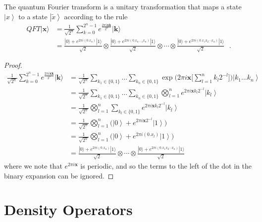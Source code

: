 \documentclass{article}
\newcommand{\ket}[1]{\ensuremath{\left|#1\right\rangle}}
\begin{document}
    \begin{theorem}
      The quantum Fourier transform is a unitary transformation that maps a state $\ket{x}$ to a state $\ket{\tilde{x}}$ according to the rule 
      \begin{align}
      QFT|\mathbf{x}\rangle &= 
      \frac{1}{\sqrt{2^n}} \sum_{k = 0}^{2^n-1} e^{\frac{2 \pi i \mathbf{x} \mathbf{k} }{2^n}} |\mathbf{k}\rangle \\ & = \frac{|0 \rangle + e^{2\pi i (0.x_n)}|1\rangle}{\sqrt{2}} \otimes \frac{|0\rangle + e^{2 \pi i (0.x_{n-1}x_n)}|1\rangle}{\sqrt{2}} \otimes \cdots \otimes \frac{|0\rangle + e^{2 \pi i (0.x_1 x_2\cdots x_n)}|1\rangle}{\sqrt{2}} \ \ \ .
      \end{align}
    \end{theorem}
    \begin{proof} 
      \begin{align} 
        \frac{1}{\sqrt{2^n}} \sum_{k = 0}^{2^n-1} e^{\frac{2 \pi i \mathbf{x} \mathbf{k} }{2^n}} |\mathbf{k}\rangle 
        & = \frac{1}{\sqrt{2^n}} \sum_{k_1 \in \{0, 1\}} \ldots \sum_{k_n \in \{0, 1\}} \exp \bigg( 2 \pi i \mathbf{x} \Big[ \sum_{l=1}^n k_l 2^{-l} \Big]\bigg) \ket{k_1 \ldots k_n} \\
        & = \frac{1}{\sqrt{2^n}} \sum_{k_1 \in \{0, 1\}} \ldots \sum_{k_n \in \{0, 1\}} \bigotimes_{l=1}^n e^{2 \pi i \mathbf{x} k_l 2^{-l}} \ket{k_l} \\
        & = \frac{1}{\sqrt{2^n}} \bigotimes_{l=1}^n \sum_{k_l \in \{0, 1\}} e^{2 \pi i \mathbf{x} k_l 2^{-l}} \ket{k_l} \\
        & = \frac{1}{\sqrt{2^n}} \bigotimes_{l=1}^n \bigg( \ket{0} + e^{2 \pi i \mathbf{x} 2^{-l}} \ket{1} \bigg) \\ 
        & = \frac{1}{\sqrt{2^n}} \bigotimes_{l=1}^n \bigg( \ket{0} + e^{2 \pi i (0.x_l)} \ket{1} \bigg) \\ 
        & = \frac{|0 \rangle + e^{2\pi i (0.x_n)}|1\rangle}{\sqrt{2}} \otimes \cdots \otimes \frac{|0\rangle + e^{2 \pi i (0.x_1 x_2\cdots x_n)}|1\rangle}{\sqrt{2}} 
      \end{align}
      where we note that $e^{2 \pi i \mathbf{x}}$ is periodic, and so the terms to the left of the dot in the binary expansion can be ignored. 
    \end{proof}

\section{Density Operators}
\end{document}
